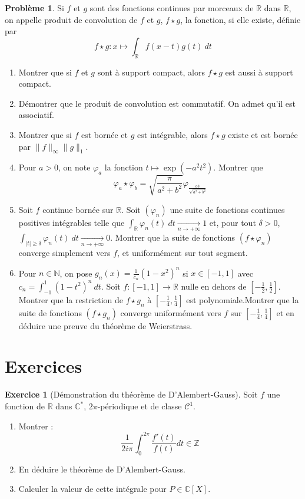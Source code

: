 \documentclass[french]{book}
\newcommand{\N}{\mathbb{N}}
\newcommand{\Z}{\mathbb{Z}}
\newcommand{\R}{\mathbb{R}}
\newcommand{\C}{\mathbb{C}}
\newcommand{\st}{^*}
\theoremstyle{definition}
\newtheorem{ex}{Exercice}[chapter]
\newtheorem{pro}{Problème}[chapter]
\theoremstyle{remark}
\begin{document}
\begin{pro}
	Si $f$ et $g$ sont des fonctions continues par morceaux de $\R$ dans $\R$, on appelle produit de convolution de $f$ et $g$, $f\star g$, la fonction, si elle existe, définie par $$f\star g:x\mapsto\displaystyle\int_\R f(x-t)g(t)\ dt$$
	\begin{enumerate}
		\item Montrer que si $f$ et $g$ sont à support compact, alors $f\star g$ est aussi à support compact.
		\item Démontrer que le produit de convolution est commutatif. On admet qu'il est associatif.
		\item Montrer que si $f$ est bornée et $g$ est intégrable, alors $f\star g$ existe et est bornée par $\lVert f\rVert_\infty\lVert g\rVert_1$.
		\item Pour $a>0$, on note $\varphi_a$ la fonction $t\mapsto\exp(-a^2t^2)$. Montrer que $$\varphi_a\star\varphi_b=\sqrt{\frac{\pi}{a^2+b^2}}\varphi_{\frac{ab}{\sqrt{a^2+b^2}}}$$
		\item Soit $f$ continue bornée sur $\R$. Soit $(\varphi_n)$ une suite de fonctions continues positives intégrables telle que $\displaystyle\int_\R\varphi_n(t)\ dt\xrightarrow[n\to+\infty]{}1$ et, pour tout $\delta>0$, $\displaystyle\int_{\lvert t\rvert\geqslant \delta}\varphi_n(t)\ dt\xrightarrow[n\to+\infty]{}0$. Montrer que la suite de fonctions $(f\star\varphi_n)$ converge simplement vers $f$, et uniformément sur tout segment.
		\item Pour $n\in\N$, on pose $\displaystyle g_n(x)=\frac{1}{c_n}(1-x^2)^n$ si $x\in[-1,1]$ avec $c_n=\displaystyle\int_{-1}^{1}(1-t^2)^n\ dt$. Soit $f:[-1,1]\to\R$ nulle en dehors de $\displaystyle\left[-\frac{1}{2},\frac{1}{2}\right]$. Montrer que la restriction de $f\star g_n$ à $\displaystyle\left[-\frac{1}{4},\frac{1}{4}\right]$ est polynomiale.Montrer que la suite de fonctions $(f\star g_n)$ converge uniformément vers $f$ sur $\displaystyle\left[-\frac{1}{4},\frac{1}{4}\right]$ et en déduire une preuve du théorème de Weierstrass.
	\end{enumerate}
\end{pro}

\section{Exercices}

\begin{ex}[Démonstration du théorème de D'Alembert-Gauss]
	Soit $f$ une fonction de $\R$ dans $\C\st$, $2\pi$-périodique et de classe $\mathcal{C}^1$.
	\begin{enumerate}
		\item Montrer : $$\frac{1}{2i\pi}\int_{0}^{2\pi}\frac{f'(t)}{f(t)}dt\in\Z$$
		\item En déduire le théorème de D'Alembert-Gauss.
		\item Calculer la valeur de cette intégrale pour $P\in\C[X]$.
	\end{enumerate}
\end{ex}
\end{document}
